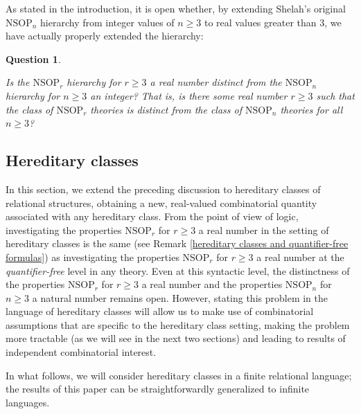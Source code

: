 \documentclass{amsart}
\newtheorem{question}[theorem]{Question}
\theoremstyle{definition}
\theoremstyle{remark}
\numberwithin{equation}{section}
\begin{document}
As stated in the introduction, it is open whether, by extending Shelah's original $\mathrm{NSOP}_{n}$ hierarchy from integer values of $n \geq 3$ to real values greater than $3$, we have actually properly extended the hierarchy:

\begin{question}\label{distinctness}

Is the $\mathrm{NSOP}_{r}$ hierarchy for $r \geq 3$ a real number distinct from the $\mathrm{NSOP}_{n}$ hierarchy for $n \geq 3$ an integer? That is, is there some real number $r \geq 3$ such that the class of $\mathrm{NSOP}_{r}$ theories is distinct from the class of $\mathrm{NSOP}_{n}$ theories for all $n \geq 3$?
\end{question}


\subsection{Hereditary classes}\label{hereditary class subsection}

In this section, we extend the preceding discussion to hereditary classes of relational structures, obtaining a new, real-valued combinatorial quantity associated with any hereditary class. From the point of view of logic, investigating the properties $\mathrm{NSOP}_{r}$ for $r \geq 3$ a real number in the setting of hereditary classes is the same (see Remark \ref{hereditary classes and quantifier-free formulas}) as investigating the properties $\mathrm{NSOP}_{r}$ for $r \geq 3$ a real number at the \textit{quantifier-free} level in any theory. Even at this syntactic level, the distinctness of the properties $\mathrm{NSOP}_{r}$ for $r \geq 3$ a real number and the properties $\mathrm{NSOP}_{n}$ for $n \geq 3$ a natural number remains open. However, stating this problem in the language of hereditary classes will allow us to make use of combinatorial assumptions that are specific to the hereditary class setting, making the problem more tractable (as we will see in the next two sections) and leading to results of independent combinatorial interest.

In what follows, we will consider hereditary classes in a finite relational language; the results of this paper can be straightforwardly generalized to infinite languages.
\end{document}
